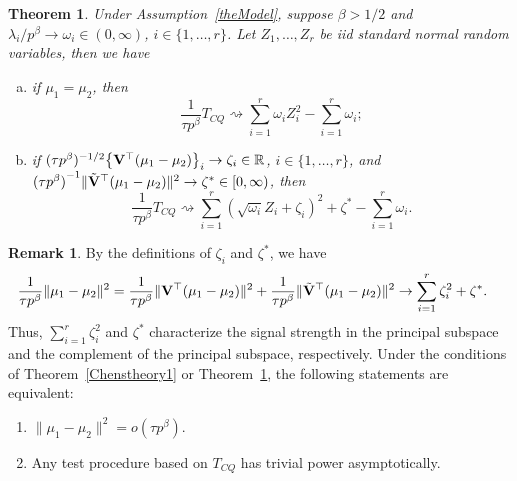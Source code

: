 \documentclass[times,sort&compress,3p]{elsarticle}
\theoremstyle{plain}
\newtheorem{theorem}{\quad\quad Theorem}
\theoremstyle{definition}
\newtheorem{remark}{\quad\quad Remark}
\theoremstyle{remark}
\begin{document}
\begin{theorem}\label{Chenstheory2}
 Under Assumption~\ref{theModel},
 suppose $\beta>1/2$ and $\lambda_i/p^\beta \to \omega_i\in(0,\infty)$, $i\in \{1,\ldots,r\}$.
    Let $Z_1,\ldots,Z_{r}$ be iid standard normal random variables,
     then we have
     \begin{enumerate}[(a)]
         \item
             if $\mu_1=\mu_2$, then
    $$
        \frac{1}{\tau p^{\beta}} T_{CQ}
        \rightsquigarrow
        \sum_{i=1}^r \omega_i Z_i^2
            -
        \sum_{i=1}^r \omega_i;
    $$
         \item
             if $(\tau p^{\beta})^{-1/2}\big\{\mathbf{V}^\top  (\mu_1-\mu_2)\big\}_i\to \zeta_i\in \mathbb{R}$, $i\in \{1,\ldots,r\}$,
             and
    ${(\tau p^\beta)}^{-1}\|\tilde{\mathbf{V}}^\top  (\mu_1-\mu_2)\|^2\to \zeta^*\in [0,\infty)$, then
    $$
        \frac{1}{\tau p^{\beta}} T_{CQ}
        \rightsquigarrow
        \sum_{i=1}^r (\sqrt{\omega_i} Z_i+\zeta_i)^2+
\zeta^*
        -
        \sum_{i=1}^r \omega_i.
    $$
     \end{enumerate}
\end{theorem}

\begin{remark}\label{remark1}
    By the definitions of $\zeta_i$ and $\zeta^*$, we have
    $$
    \begin{aligned}
        &\frac{1}{\tau p^{\beta}}\|\mu_1-\mu_2\|^2
    =
    \frac{1}{\tau p^{\beta}}\|\mathbf{V}^\top  (\mu_1-\mu_2)\|^2
        +
        \frac{1}{\tau p^{\beta}}\|\tilde{\mathbf{V}}^\top  (\mu_1-\mu_2)\|^2
    \to \sum_{i=1}^r \zeta_i^2+ \zeta^*.
    \end{aligned}
    $$
    Thus, $\sum_{i=1}^r\zeta_i^2$ and $\zeta^*$ characterize the signal strength in the principal subspace and the complement of the principal subspace, respectively.
    Under the conditions of Theorem~\ref{Chenstheory1} or Theorem~\ref{Chenstheory2}, the following statements are equivalent:
    \begin{enumerate}[(1)]
 \item
     $\|\mu_1-\mu_2\|^2=o(\tau p^{\beta})$.
        \item
            Any test procedure based on $T_{CQ}$ has trivial power asymptotically.
    \end{enumerate}
\end{remark}
\end{document}
